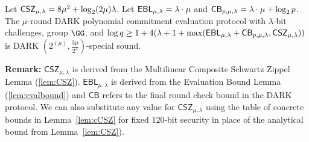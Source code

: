 \begin{theorem} Let $\mathsf{CSZ}_{\mu,\lambda} = 8 \mu^{2} + \log_2 (2 \mu) \lambda$. Let $\mathsf{EBL}_{\mu,\lambda}=\lambda\cdot \mu$ and $\mathsf{CB}_{p,\mu,\lambda}=\lambda\cdot \mu+\log_2 p$. 
The $\mu$-round DARK polynomial commitment evaluation protocol with $\lambda$-bit challenges, group $\GG$, and $\log q \geq 1 + 4(\lambda + 1 + \max(\mathsf{EBL}_{\mu,\lambda}+ \mathsf{CB}_{p,\mu,\lambda}, \mathsf{CSZ}_{\mu,\lambda}))$ is DARK $(2^{(\mu)}, \frac{3\mu}{2^\lambda})$-special sound.
\end{theorem} 
\textbf{Remark:} $\mathsf{CSZ}_{\mu, \lambda}$ is derived from the Multilinear Composite Schwartz Zippel Lemma (\cref{lem:CSZ}). $\mathsf{EBL}_{\mu, \lambda}$ is derived from the Evaluation Bound Lemma (\cref{lem:evalbound}) and $\mathsf{CB}$ refers to the final round check bound in the DARK protocol. We can also substitute any value for $\mathsf{CSZ}_{\mu,\lambda}$ using the table of concrete bounds in Lemma~\ref{lem:cCSZ} for fixed $120$-bit security in place of the analytical bound from Lemma~\ref{lem:CSZ}).%
